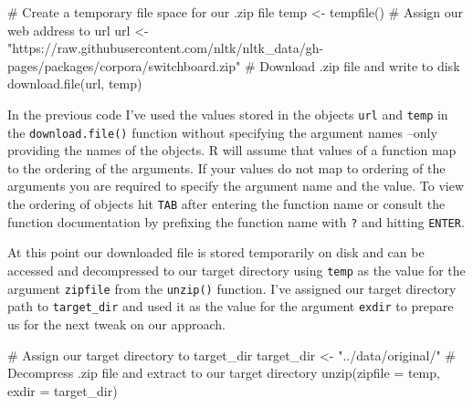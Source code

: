 \documentclass[
  letterpaper,
]{latex/krantz}
\newenvironment{Shaded}{\begin{snugshade}}{\end{snugshade}}
\newcommand{\AttributeTok}[1]{\textcolor[rgb]{0.40,0.45,0.13}{#1}}
\newcommand{\CommentTok}[1]{\textcolor[rgb]{0.37,0.37,0.37}{#1}}
\newcommand{\FunctionTok}[1]{\textcolor[rgb]{0.28,0.35,0.67}{#1}}
\newcommand{\NormalTok}[1]{\textcolor[rgb]{0.00,0.23,0.31}{#1}}
\newcommand{\OtherTok}[1]{\textcolor[rgb]{0.00,0.23,0.31}{#1}}
\newcommand{\StringTok}[1]{\textcolor[rgb]{0.13,0.47,0.30}{#1}}
\begin{document}
\begin{Shaded}
\begin{Highlighting}[]
\CommentTok{\# Create a temporary file space for our .zip file}
\NormalTok{temp }\OtherTok{\textless{}{-}} \FunctionTok{tempfile}\NormalTok{()}
\CommentTok{\# Assign our web address to \textasciigrave{}url\textasciigrave{}}
\NormalTok{url }\OtherTok{\textless{}{-}} \StringTok{"https://raw.githubusercontent.com/nltk/nltk\_data/gh{-}pages/packages/corpora/switchboard.zip"}
\CommentTok{\# Download .zip file and write to disk}
\FunctionTok{download.file}\NormalTok{(url, temp)}
\end{Highlighting}
\end{Shaded}

\begin{tcolorbox}[enhanced jigsaw, toprule=.15mm, bottomtitle=1mm, coltitle=black, title=\textcolor{quarto-callout-warning-color}{\faExclamationTriangle}\hspace{0.5em}{Tip}, left=2mm, colframe=quarto-callout-warning-color-frame, bottomrule=.15mm, colbacktitle=quarto-callout-warning-color!10!white, leftrule=.75mm, colback=white, titlerule=0mm, breakable, toptitle=1mm, opacityback=0, arc=.35mm, rightrule=.15mm, opacitybacktitle=0.6]

In the previous code I've used the values stored in the objects
\texttt{url} and \texttt{temp} in the \texttt{download.file()} function
without specifying the argument names --only providing the names of the
objects. R will assume that values of a function map to the ordering of
the arguments. If your values do not map to ordering of the arguments
you are required to specify the argument name and the value. To view the
ordering of objects hit \texttt{TAB} after entering the function name or
consult the function documentation by prefixing the function name with
\texttt{?} and hitting \texttt{ENTER}.

\end{tcolorbox}

At this point our downloaded file is stored temporarily on disk and can
be accessed and decompressed to our target directory using \texttt{temp}
as the value for the argument \texttt{zipfile} from the \texttt{unzip()}
function. I've assigned our target directory path to
\texttt{target\_dir} and used it as the value for the argument
\texttt{exdir} to prepare us for the next tweak on our approach.

\begin{Shaded}
\begin{Highlighting}[]
\CommentTok{\# Assign our target directory to \textasciigrave{}target\_dir\textasciigrave{}}
\NormalTok{target\_dir }\OtherTok{\textless{}{-}} \StringTok{"../data/original/"}
\CommentTok{\# Decompress .zip file and extract to our target directory}
\FunctionTok{unzip}\NormalTok{(}\AttributeTok{zipfile =}\NormalTok{ temp, }\AttributeTok{exdir =}\NormalTok{ target\_dir)}
\end{Highlighting}
\end{Shaded}
\end{document}
